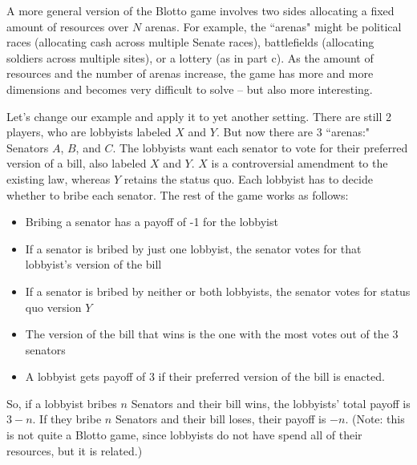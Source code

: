 \documentclass[10pt]{article}
\begin{document}
A more general version of the Blotto game involves two sides allocating a fixed amount of resources over $N$ arenas. For example, the ``arenas" might be political races (allocating cash across multiple Senate races), battlefields (allocating soldiers across multiple sites), or a lottery (as in part c). As the amount of resources and the number of arenas increase, the game has more and more dimensions and becomes very difficult to solve -- but also more interesting.

Let's change our example and apply it to yet another setting. There are still 2 players, who are lobbyists labeled $X$ and $Y$. But now there are 3 ``arenas:" Senators $A$, $B$, and $C$. The lobbyists want each senator to vote for their preferred version of a bill, also labeled $X$ and $Y$. $X$ is a controversial amendment to the existing law, whereas $Y$ retains the status quo. Each lobbyist has to decide whether to bribe each senator. The rest of the game works as follows:
\begin{itemize}
\item Bribing a senator has a payoff of -1 for the lobbyist
\item If a senator is bribed by just one lobbyist, the senator votes for that lobbyist's version of the bill
\item If a senator is bribed by neither or both lobbyists, the senator votes for status quo version $Y$
\item The version of the bill that wins is the one with the most votes out of the 3 senators
\item A lobbyist gets payoff of 3 if their preferred version of the bill is enacted.
\end{itemize}
So, if a lobbyist bribes $n$ Senators and their bill wins, the lobbyists' total payoff is $3-n$. If they bribe $n$ Senators and their bill loses, their payoff is $-n$. (Note: this is not quite a Blotto game, since lobbyists do not have spend all of their resources, but it is related.)
\end{document}
